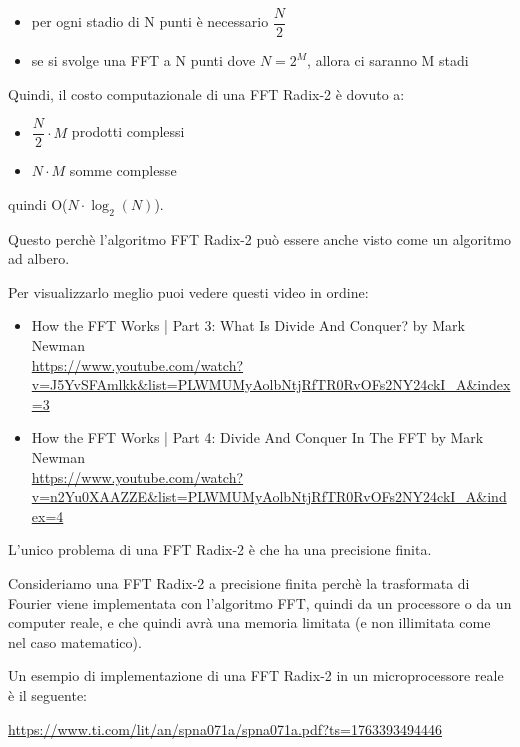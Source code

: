 \begin{itemize}
    \item per ogni stadio di N punti è necessario $\dfrac{N}{2}$ 
    \item se si svolge una FFT a N punti dove $N = 2^{M}$, allora ci saranno M stadi 
\end{itemize} 

\newpage 

Quindi, il costo computazionale di una FFT Radix-2 è dovuto a: 

\begin{itemize}
    \item $\dfrac{N}{2} \cdot M$ prodotti complessi 
    \item $N \cdot M$ somme complesse 
\end{itemize}

quindi O($N \cdot \log_{2} \left(N\right)$). \newline 


\begin{tcolorbox}
    Questo perchè l'algoritmo FFT Radix-2 può essere anche visto come un algoritmo ad albero. \newline 

    Per visualizzarlo meglio puoi vedere questi video in ordine: 

    \begin{itemize}
        \item How the FFT Works | Part 3: What Is Divide And Conquer? by Mark Newman\\\url{https://www.youtube.com/watch?v=J5YvSFAmlkk&list=PLWMUMyAolbNtjRfTR0RvOFs2NY24ckI_A&index=3}
        \item How the FFT Works | Part 4: Divide And Conquer In The FFT by Mark Newman\\\url{https://www.youtube.com/watch?v=n2Yu0XAAZZE&list=PLWMUMyAolbNtjRfTR0RvOFs2NY24ckI_A&index=4}
    \end{itemize}
\end{tcolorbox}

L'unico problema di una FFT Radix-2 è che ha una precisione finita. \newline

\begin{tcolorbox}
    Consideriamo una FFT Radix-2 a precisione finita perchè la trasformata di Fourier viene implementata con l'algoritmo FFT, 
    quindi da un processore o da un computer reale, e che quindi avrà una memoria limitata (e non illimitata come nel caso matematico). \newline 
    
    Un esempio di implementazione di una FFT Radix-2 in un microprocessore reale è il seguente: \newline 

    \url{https://www.ti.com/lit/an/spna071a/spna071a.pdf?ts=1763393494446}
\end{tcolorbox}

